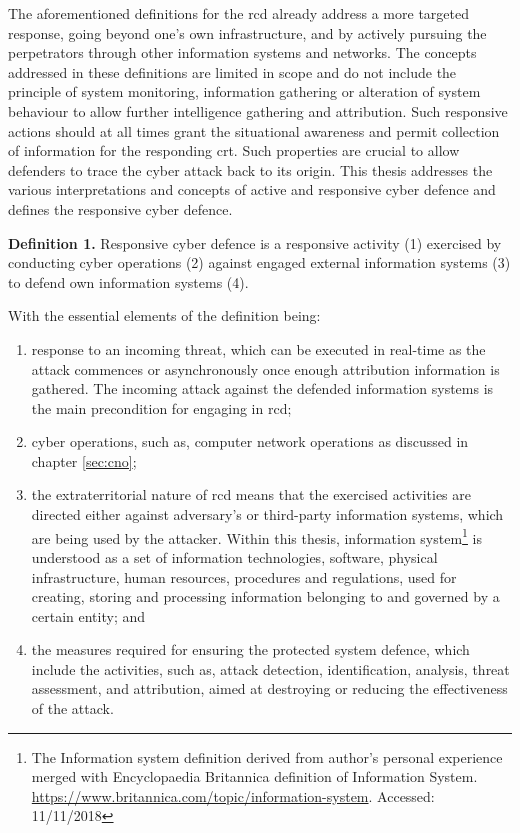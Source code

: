 The aforementioned definitions for the \gls{rcd} already address a more targeted response, going beyond one's own infrastructure, and by actively pursuing the perpetrators through other information systems and networks. The concepts addressed in these definitions are limited in scope and do not include the principle of system monitoring, information gathering or alteration of system behaviour to allow further intelligence gathering and attribution. Such responsive actions should at all times grant the situational awareness and permit collection of information for the responding \gls{crt}. Such properties are crucial to allow defenders to trace the cyber attack back to its origin.
This thesis addresses the various interpretations and concepts of active and responsive cyber defence and defines the responsive cyber defence.
\begin{description}
    \label{def:rcd}
    \item \textbf{Definition 1.} Responsive cyber defence is a responsive activity (1) exercised by conducting cyber operations (2) against engaged external information systems (3) to defend own information systems (4).

    With the essential elements of the definition being:
    \begin{enumerate}
        \item response to an incoming threat, which can be executed in real-time as the attack commences or asynchronously once enough attribution information is gathered. The incoming attack against the defended information systems is the main precondition for engaging in \gls{rcd};
        \item cyber operations, such as, computer network operations as discussed in chapter \ref{sec:cno};
        \item the extraterritorial nature of \gls{rcd} means that the exercised activities are directed either against adversary's or third-party information systems, which are being used by the attacker. Within this thesis, information system\footnote{The Information system definition derived from author's personal experience merged with Encyclopaedia Britannica definition of Information System. \url{https://www.britannica.com/topic/information-system}. Accessed: 11/11/2018} is understood as a set of information technologies, software, physical infrastructure, human resources, procedures and regulations, used for creating, storing and processing information belonging to and governed by a certain entity; and
        \item the measures required for ensuring the protected system defence, which include the activities, such as, attack detection, identification, analysis, threat assessment, and attribution, aimed at destroying or reducing the effectiveness of the attack.
    \end{enumerate}
\end{description}

